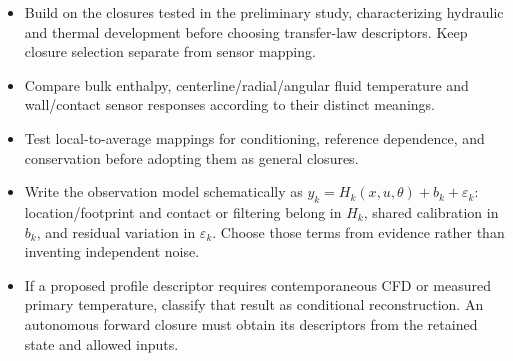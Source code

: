 \begin{itemize}[leftmargin=*]
\item Build on the closures tested in the preliminary study, characterizing hydraulic and thermal development before choosing transfer-law descriptors. Keep closure selection separate from sensor mapping.
\item Compare bulk enthalpy, centerline/\allowbreak{}radial/\allowbreak{}angular fluid temperature and wall/\allowbreak{}contact sensor responses according to their distinct meanings.
\item Test local-to-average mappings for conditioning, reference dependence, and conservation before adopting them as general closures.
\item Write the observation model schematically as $y_k=H_k(x,u,\theta)+b_k+\varepsilon_k$: location/\allowbreak{}footprint and contact or filtering belong in $H_k$, shared calibration in $b_k$, and residual variation in $\varepsilon_k$. Choose those terms from evidence rather than inventing independent noise.\cite{jcgm2020measurementmodels}
\item If a proposed profile descriptor requires contemporaneous CFD or measured primary temperature, classify that result as conditional reconstruction. An autonomous forward closure must obtain its descriptors from the retained state and allowed inputs.


\end{itemize}
